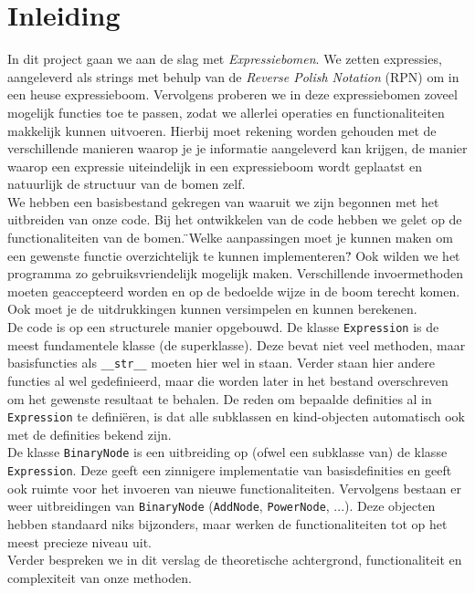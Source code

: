 \documentclass[12pt]{article}
\begin{document}
\section{Inleiding}
In dit project gaan we aan de slag met \textit{Expressiebomen}. We zetten expressies, aangeleverd als strings met behulp van de \textit{Reverse Polish Notation} (RPN) om in een heuse expressieboom. Vervolgens proberen we in deze expressiebomen zoveel mogelijk functies toe te passen, zodat we allerlei operaties en functionaliteiten makkelijk kunnen uitvoeren. Hierbij moet rekening worden gehouden met de verschillende manieren waarop je je informatie aangeleverd kan krijgen, de manier waarop een expressie uiteindelijk in een expressieboom wordt geplaatst en natuurlijk de structuur van de bomen zelf. \\ \newline
We hebben een basisbestand gekregen van waaruit we zijn begonnen met het uitbreiden van onze code. Bij het ontwikkelen van de code hebben we gelet op de functionaliteiten van de bomen. \"{}Welke aanpassingen moet je kunnen maken om een gewenste functie overzichtelijk te kunnen implementeren?\"{} Ook wilden we het programma zo gebruiksvriendelijk mogelijk maken. Verschillende invoermethoden moeten geaccepteerd worden en op de bedoelde wijze in de boom terecht komen. Ook moet je de uitdrukkingen kunnen versimpelen en kunnen berekenen. \\ \newline
De code is op een structurele manier opgebouwd. De klasse \texttt{Expression} is de meest fundamentele klasse (de superklasse). Deze bevat niet veel methoden, maar basisfuncties als \texttt{\_\_str\_\_} moeten hier wel in staan. Verder staan hier andere functies al wel gedefinieerd, maar die worden later in het bestand overschreven om het gewenste resultaat te behalen. De reden om bepaalde definities al in \texttt{Expression} te defini\"{e}ren, is dat alle subklassen en kind-objecten automatisch ook met de definities bekend zijn. \\
De klasse \texttt{BinaryNode} is een uitbreiding op (ofwel een subklasse van) de klasse \texttt{Expression}. Deze geeft een zinnigere implementatie van basisdefinities en geeft ook ruimte voor het invoeren van nieuwe functionaliteiten. Vervolgens bestaan er weer uitbreidingen van \texttt{BinaryNode} (\texttt{AddNode}, \texttt{PowerNode}, ...). Deze objecten hebben standaard niks bijzonders, maar werken de functionaliteiten tot op het meest precieze niveau uit. \\ \newline 
Verder bespreken we in dit verslag de theoretische achtergrond, functionaliteit en complexiteit van onze methoden.
\newpage
\end{document}
